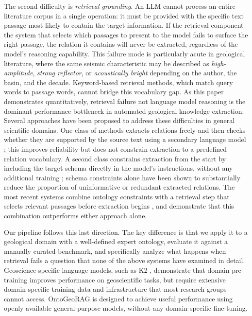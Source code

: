 \documentclass[10pt]{article}
\newcommand{\method}{OntoGeoRAG}
\begin{document}
The second difficulty is \emph{retrieval grounding}. An LLM cannot
process an entire literature corpus in a single operation: it must be
provided with the specific text passage most likely to contain the
target information. If the retrieval component the system that
selects which passages to present to the model fails to surface
the right passage, the relation it contains will never be extracted,
regardless of the model's reasoning capability. This failure mode is
particularly acute in geological literature, where the same seismic
characteristic may be described as \emph{high-amplitude},
\emph{strong reflector}, or \emph{acoustically bright} depending on
the author, the basin, and the decade. Keyword-based retrieval
methods, which match query words to passage words, cannot bridge this
vocabulary gap. As this paper demonstrates quantitatively, retrieval
failure not language model reasoning is the dominant
performance bottleneck in automated geological knowledge extraction.
Several approaches have been proposed to address these difficulties
in general scientific domains.
One class of methods extracts relations freely and then checks
whether they are supported by the source text using a secondary
language model \citep{huang2025llmsgoodgraphjudge}; this improves
reliability but does not constrain extraction to a predefined
relation vocabulary.
A second class constrains extraction from the start by including
the target schema directly in the model's instructions, without
any additional training \citep{kallm2024,
zhang2024extractdefinecanonicalizellmbased}; schema constraints
alone have been shown to substantially reduce the proportion of
uninformative or redundant extracted relations.
The most recent systems combine ontology constraints with a
retrieval step that selects relevant passages before extraction
begins \citep{khorshidi2025odkeontologyguidedopendomainknowledge,
sharma2024ogragontologygroundedretrievalaugmentedgeneration},
and demonstrate that this combination outperforms either
approach alone.

Our pipeline follows this last direction.
The key difference is that we apply it to a geological domain
with a well-defined expert ontology, evaluate it against a
manually curated benchmark, and specifically analyze what happens
when retrieval fails a question that none of the above systems
have examined in detail.
Geoscience-specific language models, such as K2
\citep{deng2023k2foundationlanguagemodel}, demonstrate that
domain pre-training improves performance on geoscientific tasks,
but require extensive domain-specific training data and
infrastructure that most research groups cannot access.
\method{} is designed to achieve useful performance using
openly available general-purpose models, without any
domain-specific fine-tuning.
\end{document}
